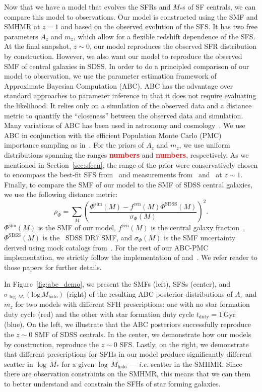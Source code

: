 \documentclass[12pt, letterpaper, preprint]{aastex}
\newcommand{\todo}[1]{{\bf \textcolor{red}{#1}}}
\newcommand{\beq}{\begin{equation}}
\newcommand{\eeq}{\end{equation}}
\begin{document}
Now that we have a model that evolves the SFRs and $M_*$s of SF centrals, 
we can compare this model to observations. Our model is constructed using the 
SMF and SMHMR at $z = 1$ and based on the observed evolution of the SFS. 
It has two free parameters $A_z$ and $m_z$, which allow for a flexible redshift 
dependence of the SFS. At the final snapshot, $z \sim 0$, our model reproduces 
the observed SFR distribution by construction. However, we also want our model to 
reproduce the observed SMF of central galaxies in SDSS. In order to do a principled
comparison of our model to observation, we use the parameter estimation framework 
of Approximate Bayesian Computation (ABC). ABC has the advantage over standard 
approaches to parameter inference in that it does not 
require evaluating the likelihood. It relies only on a simulation of the observed 
data and a distance metric to quantify the ``closeness'' between the observed data
and simulation. Many variations of ABC has been used in astronomy and 
cosmology~\citep[\emph{e.g.}][]{cameron2012,weyant2013,ishida2015,alsing2018}. 
We use ABC in conjunction with the efficient Population Monte Carlo (PMC)
importance sampling as in~\citep{hahn2016, hahn2017}. For the priors of $A_z$ and $m_z$, 
we use uniform distributions spanning the ranges \todo{numbers} and \todo{numbers}, 
respectively. As we mentioned in Section~\ref{sec:sfcen}, the range of the prior 
were conservatively chosen to encompass the best-fit SFS from~\cite{speagle2014} 
and measurements from~\cite{moustakas2013} and~\cite{lee2015} at $z \sim 1$. 
Finally, to compare the SMF of our model to the SMF of SDSS central galaxies, 
we use the following distance metric: 
\beq
\rho_\Phi = \sum\limits_{M} \left( \frac{\Phi^\mathrm{sim}(M) - f^\mathrm{cen}(M) \Phi^\mathrm{SDSS}(M)}{\sigma_\Phi(M)}\right)^2.
\eeq
$\Phi^\mathrm{sim}(M)$ is the SMF of our model, $f^\mathrm{cen}(M)$ is the
central galaxy fraction~\cite{wetzel2013}, $\Phi^\mathrm{SDSS}(M)$ is 
the~\cite{li2009} SDSS DR7 SMF, and $\sigma_\Phi(M)$ is the SMF uncertainty 
derived using mock catalogs from~\cite{li2009}. For the rest of our ABC-PMC 
implementation, we strictly follow the implementation of \cite{hahn2017b} 
and~\cite{hahn2017a}. We refer reader to those papers for further details.

In Figure~\ref{fig:abc_demo}, we present the SMFs (left), SFSs (center), and 
$\sigma_{\log\,M_*}(\mathrm{log}\,M_\mathrm{halo})$ (right) of the resulting
ABC posterior distributions of $A_z$ and $m_z$ for two models with different 
SFH prescriptions: one with no star formation duty cycle (red) and the other 
with star formation duty cycle $t_\mathrm{duty} = 1\,\mathrm{Gyr}$ (blue). 
On the left, we illustrate that the ABC posteriors successfully reproduce
the $z \sim 0$ SMF of SDSS centrals. In the center, we demonstrate how our 
models by construction, reproduce the $z\sim0$ SFS. Lastly, on the right, 
we demonstrate that different prescriptions for SFHs in our model produce significantly
different scatter in $\log\,M_*$ for a given $\log\,M_\mathrm{halo}$ --- 
\emph{i.e.} scatter in the SMHMR. Since there are observation constraints on 
the SMHMR, this means that we can them to better understand and constrain 
the SFHs of star forming galaxies. 
\end{document}
